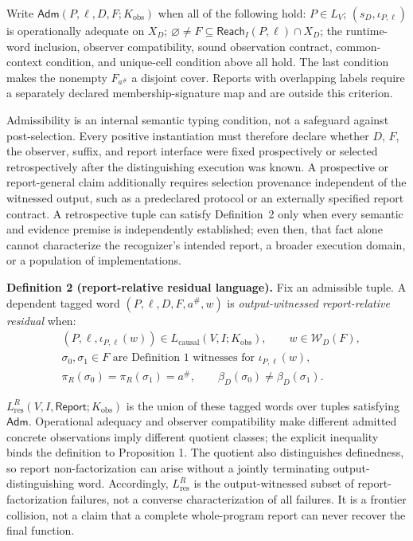 \documentclass[conference]{IEEEtran}
\begin{document}
Write $\mathsf{Adm}(P,\ell,D,F;K_{\mathrm{obs}})$ when all of the following hold: $P\in L_V$; $(s_D,\iota_{P,\ell})$ is operationally adequate on $X_D$; $\varnothing\ne F\subseteq\mathsf{Reach}_I(P,\ell)\cap X_D$; the runtime-word inclusion, observer compatibility, sound observation contract, common-context condition, and unique-cell condition above all hold. The last condition makes the nonempty $F_{a^\#}$ a disjoint cover. Reports with overlapping labels require a separately declared membership-signature map and are outside this criterion.

Admissibility is an internal semantic typing condition, not a safeguard against post-selection. Every positive instantiation must therefore declare whether $D$, $F$, the observer, suffix, and report interface were fixed prospectively or selected retrospectively after the distinguishing execution was known. A prospective or report-general claim additionally requires selection provenance independent of the witnessed output, such as a predeclared protocol or an externally specified report contract. A retrospective tuple can satisfy Definition~2 only when every semantic and evidence premise is independently established; even then, that fact alone cannot characterize the recognizer's intended report, a broader execution domain, or a population of implementations.

\medskip
\noindent\textbf{Definition 2 (report-relative residual language).}
Fix an admissible tuple. A dependent tagged word $(P,\ell,D,F,a^\#,w)$ is \emph{output-witnessed report-relative residual} when:
\begin{equation}
\begin{aligned}
&(P,\ell,\iota_{P,\ell}(w))\in L_{\mathrm{causal}}(V,I;K_{\mathrm{obs}}),\qquad
w\in\mathcal W_D(F),\\
&\sigma_0,\sigma_1\in F
\text{ are Definition 1 witnesses for }\iota_{P,\ell}(w),\\
&\pi_R(\sigma_0)=\pi_R(\sigma_1)=a^\#,
\qquad
\beta_D(\sigma_0)\ne\beta_D(\sigma_1).
\end{aligned}
\end{equation}

$L_{\mathrm{res}}^R(V,I,\mathsf{Report};K_{\mathrm{obs}})$ is the union of these tagged words over tuples satisfying $\mathsf{Adm}$. Operational adequacy and observer compatibility make different admitted concrete observations imply different quotient classes; the explicit inequality binds the definition to Proposition 1. The quotient also distinguishes definedness, so report non-factorization can arise without a jointly terminating output-distinguishing word. Accordingly, $L_{\mathrm{res}}^R$ is the output-witnessed subset of report-factorization failures, not a converse characterization of all failures. It is a frontier collision, not a claim that a complete whole-program report can never recover the final function.
\end{document}
